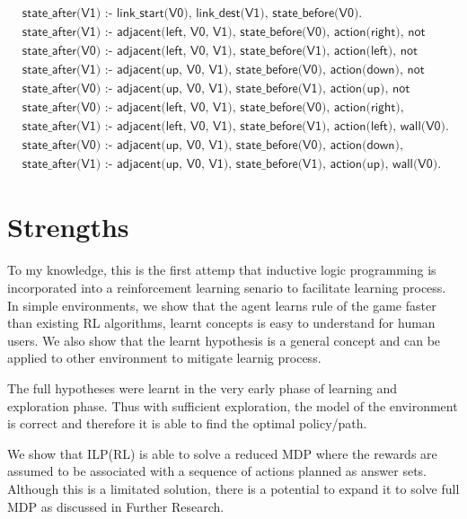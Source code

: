 \begin{equation}
\begin{split}
&\textsf{state\_after(V1) :- link\_start(V0), link\_dest(V1), state\_before(V0).}\\
&\textsf{state\_after(V1) :- adjacent(left, V0, V1), state\_before(V0), action(right), not wall(V1).}\\
&\textsf{state\_after(V0) :- adjacent(left, V0, V1), state\_before(V1), action(left), not wall(V0).}\\
&\textsf{state\_after(V1) :- adjacent(up, V0, V1), state\_before(V0), action(down), not wall(V1).}\\
&\textsf{state\_after(V0) :- adjacent(up, V0, V1), state\_before(V1), action(up), not wall(V0).}\\
&\textsf{state\_after(V0) :- adjacent(left, V0, V1), state\_before(V0), action(right), wall(V1).}\\
&\textsf{state\_after(V1) :- adjacent(left, V0, V1), state\_before(V1), action(left), wall(V0).}\\
&\textsf{state\_after(V0) :- adjacent(up, V0, V1), state\_before(V0), action(down), wall(V1).}\\
&\textsf{state\_after(V1) :- adjacent(up, V0, V1), state\_before(V1), action(up), wall(V0).}
\end{split}
\label{experiment4_ilasp}
\end{equation}

\section{Strengths}
\label{strengths}

To my knowledge, this is the first attemp that inductive logic programming is incorporated into a reinforcement learning senario to facilitate learning process.
In simple environments, we show that the agent learns rule of the game faster than existing RL algorithms, learnt concepts is easy to understand for human users.
We also show that the learnt hypothesis is a general concept and can be applied to other environment to mitigate learnig process.

The full hypotheses were learnt in the very early phase of learning and exploration phase. Thus with sufficient exploration, the model of the environment is correct
and therefore it is able to find the optimal policy/path. 

We show that ILP(RL) is able to solve a reduced MDP where the rewards are assumed to be associated with a sequence of actions planned as answer sets.
Although this is a limitated solution, there is a potential to expand it to solve full MDP as discussed in Further Research. 

